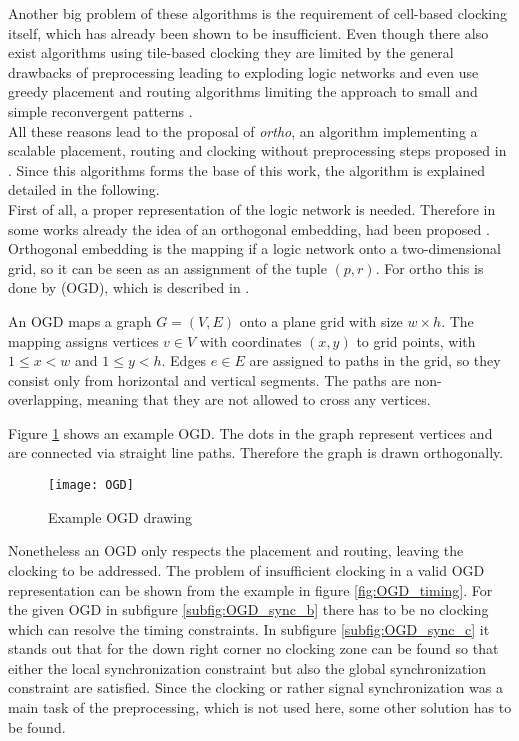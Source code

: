Another big problem of these algorithms is the requirement of cell-based clocking itself, which has already been shown to be insufficient. Even though there also exist algorithms using tile-based clocking they are limited by the general drawbacks of preprocessing \cite{trindade2016placement} leading to exploding logic networks and even use greedy placement and routing algorithms limiting the approach to small and simple reconvergent patterns \cite{QCA-LG}.\\

All these reasons lead to the proposal of \textit{ortho}, an algorithm implementing a scalable placement, routing and clocking without preprocessing steps proposed in \cite{ortho}. Since this algorithms forms the base of this work, the algorithm is explained detailed in the following.\\
First of all, a proper representation of the logic network is needed. Therefore in some works already the idea of an orthogonal embedding, had been proposed \cite{dummy_and_buffer_nodes}. Orthogonal embedding is the mapping if a logic network onto a two-dimensional grid, so it can be seen as an assignment of the tuple $(p, r)$. For ortho this is done by  (OGD), which is described in \cite{OGD}.

\begin{definition}
	An OGD maps a graph $G = (V, E)$ onto a plane grid with size $w \times h$. The mapping assigns vertices $v \in V$ with coordinates $(x, y)$ to grid points, with $1 \leq x < w$ and $1 \leq y < h$. Edges $e \in E$ are assigned to paths in the grid, so they consist only from horizontal and vertical segments. The paths are non-overlapping, meaning that they are not allowed to cross any vertices.
\end{definition}

Figure \ref{fig:OGD_example} shows an example OGD. The dots in the graph represent vertices and are connected via straight line paths. Therefore the graph is drawn orthogonally.

\begin{figure}
	\centering
	\texttt{[image: OGD]}
	\caption{Example OGD drawing}\label{fig:OGD_example}
\end{figure}

Nonetheless an OGD only respects the placement and routing, leaving the clocking to be addressed. The problem of insufficient clocking in a valid OGD representation can be shown from the example in figure \ref{fig:OGD_timing}. For the given OGD in subfigure \ref{subfig:OGD_sync_b} there has to be no clocking which can resolve the timing constraints. In subfigure \ref{subfig:OGD_sync_c} it stands out that for the down right corner no clocking zone can be found so that either the local synchronization constraint but also the global synchronization constraint are satisfied. Since the clocking or rather signal synchronization was a main task of the preprocessing, which is not used here, some other solution has to be found.

